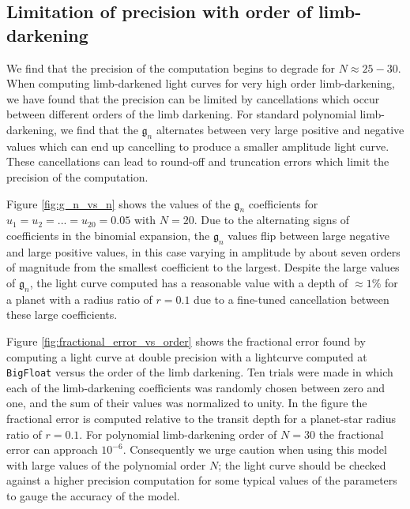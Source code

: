 \documentclass[modern,trackchanges]{aastex63}
\newcommand{\edited}{}
\begin{document}
{\edited
\subsection{Limitation of precision with order of limb-darkening}

We find that the precision of the computation begins to degrade for $N \approx 25-30$.
When computing limb-darkened light curves for very high order limb-darkening,
we have found that the precision can be limited by cancellations which occur
between different orders of the limb darkening.  For standard polynomial
limb-darkening, we find that the $\mathfrak{g}_n$ alternates between very large
positive and negative
values which can end up cancelling to produce a smaller amplitude light curve.
These cancellations can lead to round-off and truncation errors which limit
the precision of the computation.

Figure \ref{fig:g_n_vs_n} shows the values of the $\mathfrak{g}_n$ coefficients
for $u_1 = u_2 = ... = u_{20} = 0.05$ with $N=20$.  Due to the alternating
signs of coefficients in the binomial expansion, the $\mathfrak{g}_n$ values flip
between large negative and large positive values, in this case varying in amplitude
by about seven orders of magnitude from the smallest coefficient to the largest.  
Despite the large values of $\mathfrak{g}_n$, the light curve computed has a reasonable 
value with a depth of $\approx 1$\% for a planet with a radius ratio of $r=0.1$
due to a fine-tuned cancellation between these large coefficients.

Figure \ref{fig:fractional_error_vs_order} shows the fractional error found
by computing a light curve at double precision with a lightcurve computed
at \texttt{BigFloat} versus the order of the limb darkening.  Ten trials
were made in which each of the limb-darkening coefficients was randomly
chosen between zero and one, and the sum of their values was normalized
to unity.  In the figure the fractional error is computed relative to
the transit depth for a planet-star radius ratio of $r=0.1$.  For polynomial
limb-darkening order of $N=30$ the fractional error can approach $10^{-6}$.
Consequently we urge caution when using this model with large values of
the polynomial order $N$; the light curve should be checked against a higher 
precision computation for some typical values of the parameters to gauge the 
accuracy of the model.

}
\end{document}
